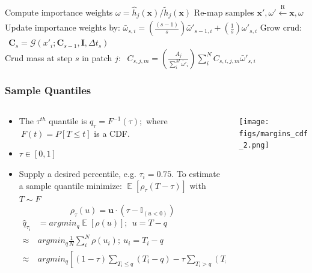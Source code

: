 \documentclass[t, pdftex]{beamer}
\DeclareMathOperator*{\E}{\mathbb{E}}
\begin{document}
\begin{frame}
\begin{algorithm}[H]
\begin{algorithmic}[1]
        \STATE Compute importance weights $\omega = \hat h_j(\mathbf x) /  \tilde h_j(\mathbf x) $
        \STATE Re-map samples  $\mathbf x', \omega' \xleftarrow[\text{ }]{\text{R}} \mathbf x, \omega $
        \STATE Update importance weights by:  $\bar{\omega}_{s,i} = \left( \frac{(s-1)}{s} \right) \bar \omega'_{s-1,i} + \left( \frac{1}{s} \right) \omega'_{s,i}$
        \STATE Grow crud:
        $\ \ \mathbf C_s = \mathcal G(x'_i; \mathbf C_{s-1}, \mathbf I, \Delta t_s)$ \\
        \STATE Crud mass at step $s$ in patch $j$:
        $\ \ C_{s,j,m} = \left( \frac{A_j}{\sum_i^M \bar \omega'_i} \right) \sum_i^N C_{s,i,j,m} \bar \omega'_{s,i}$
        \ENDFOR
        \ENDFOR
        \ENDFOR
    \end{algorithmic}
    \label{algo:hi2lo_crud_algo}
\end{algorithm}
\end{frame}

\begin{frame}
\frametitle{Sample Quantiles}
\vspace{-15pt}
\begin{columns}
    \begin{column}{0.5\textwidth}
        \scriptsize{
            \begin{itemize}
                \item The $\tau^{th}$ quantile is $q_\tau = F^{-1}(\tau); $ where $\ F(t)=P[T \leq t]$ is a CDF.
                \item $\tau \in [0, 1]$
                \item Supply a desired percentile, e.g. $\tau_i = 0.75$.
                To estimate a sample quantile minimize: $\E[\rho_\tau(T - \tau)]$ with $T \sim F$
                \[
                \rho_\tau( u) = \mathbf u \cdot (\tau - \mathbb{I}_{( u < 0)})
                \]
                \begin{equation}
                \left.\begin{aligned}
                \hat q_{\tau_i} &= argmin_{q} \E[\rho(u)];\ \  u = T - q  \\
                \approx & argmin_q  \frac{1}{N} \sum_i^N \rho(u_i); \ u_i = T_i - q \\
                \approx & argmin_q \left[ (1-\tau) \sum_{T_i \leq q}( T_i - q ) - \tau \sum_{T_i > q} (T_i - q) \right]
                \end{aligned}\right. \nonumber
                \end{equation}
            \end{itemize}
        }
    \end{column}
    \begin{column}{0.5\textwidth}  %
        \begin{center}
            \texttt{[image: figs/margins\_cdf\_2.png]}
        \end{center}
    \end{column}
\end{columns}
\end{frame}
\end{document}

